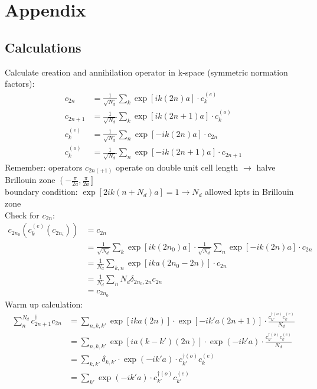\chapter{Appendix}

\section{Calculations}



Calculate creation and annihilation operator in k-space (symmetric normation factors):
\begin{align}
c_{2n} &= \frac{1}{\sqrt{N_d}}\sum_k\exp\left[ik\left(2n\right)a\right]\cdot c_{k}^{(e)}\\
c_{2n+1} &= \frac{1}{\sqrt{N_d}}\sum_k\exp\left[ik\left(2n+1\right)a\right]\cdot c_{k}^{(o)}\\
c_k^{(e)} &= \frac{1}{\sqrt{N_d}}\sum_n \exp\left[-ik\left(2n\right)a\right]\cdot c_{2n}\\
c_k^{(o)} &= \frac{1}{\sqrt{N_d}}\sum_n \exp\left[-ik\left(2n+1\right)a\right]\cdot c_{2n+1}
\end{align}
Remember: operators $c_{2n(+1)}$ operate on double unit cell length $\rightarrow$ halve Brillouin zone $\left(-\frac{\pi}{2a}, \frac{\pi}{2a}\right]$\\
boundary condition: $\exp\left[2ik\left(n+N_d\right)a\right] = 1 \rightarrow N_d$ allowed kpts in Brillouin zone\\
Check for $c_{2n}$:
\begin{align}
c_{2n_0}(c_k^{(e)}(c_{2n_i})) &= c_{2n} \\
&= \frac{1}{\sqrt{N_d}}\sum_k\exp\left[ik\left(2n_0\right)a\right]\cdot \frac{1}{\sqrt{N_d}}\sum_n \exp\left[-ik\left(2n\right)a\right]\cdot c_{2n}\\
&= \frac{1}{N_d}\sum_{k, n} \exp\left[ika\left(2n_0-2n\right)\right]\cdot c_{2n}\\
&= \frac{1}{N_d}\sum_n N_d \delta_{2n_0,2n} c_{2n}\\
&= c_{2n_0}
\end{align}
Warm up calculation:
\begin{align}
\sum_n^{N_d}c_{2n+1}^\dagger c_{2n} &=\sum_{n, k, k'} \exp\left[ika(2n)\right] \cdot \exp\left[-ik'a(2n+1)\right] \cdot \frac{c_{k'}^{\dagger(o)}c_k^{(e)}}{N_d} \\
&=\sum_{n, k, k'} \exp\left[ia(k-k')(2n)\right] \cdot \exp\left(-ik'a\right) \cdot  \frac{c_{k'}^{\dagger(o)}c_k^{(e)}}{N_d} \\
&=\sum_{k, k'} \delta_{k, k'} \cdot \exp\left(-ik'a\right)\cdot c_{k'}^{\dagger(o)}c_k^{(e)}\\
&=\sum_{k'} \exp\left(-ik'a\right) \cdot c_{k'}^{\dagger(o)}c_{k'}^{(e)}
\end{align}
